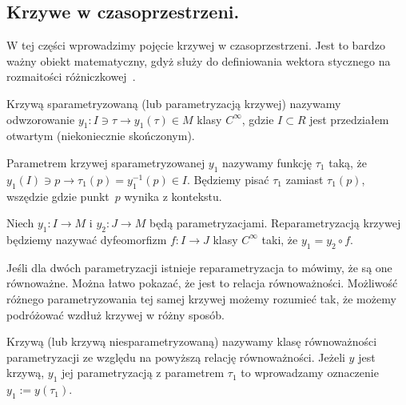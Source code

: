 \subsection{Krzywe w czasoprzestrzeni.}
W tej części wprowadzimy pojęcie krzywej w czasoprzestrzeni. 
Jest to bardzo ważny obiekt matematyczny, gdyż służy do definiowania
wektora stycznego na rozmaitości różniczkowej~\cite{ganca1987}. 
\begin{definition}
Krzywą sparametryzowaną (lub parametryzacją krzywej) nazywamy 
odwzorowanie 
$ y_1 : I \ni \tau \to y_1(\tau) \in M$ klasy $C^\infty$, 
gdzie $I \subset R$ 
jest przedziałem otwartym (niekoniecznie skończonym).
\end{definition}
\begin{definition}
Parametrem krzywej sparametryzowanej $y_1$ 
nazywamy funkcję $\tau_1$ taką, że $ y_1(I) \ni p 
\to \tau_1(p) = y_1^{-1}( p )\in I$. 
Będziemy pisać
$\tau_1$ zamiast $\tau_1(p)$, wszędzie gdzie punkt~$p$ 
wynika z kontekstu.
\end{definition}
\begin{definition}
Niech $y_1: I \to M$ i $y_2:J\to M$ będą parametryzacjami.
Reparametryzacją krzywej będziemy nazywać dyfeomorfizm $f : I \to J$
klasy $C^\infty$
taki, że $y_1 = y_2 \circ f$.
\end{definition}
Jeśli dla dwóch parametryzacji istnieje reparametryzacja to 
mówimy, że są one równoważne. Można łatwo pokazać, że jest to
relacja równoważności. Możliwość różnego parametryzowania tej 
samej krzywej możemy rozumieć tak, że możemy podróżować wzdłuż
krzywej w różny sposób.
\begin{definition}
Krzywą (lub krzywą niesparametryzowaną) nazywamy klasę równoważności
parametryzacji ze względu na powyższą relację równoważności.
Jeżeli $y$ jest krzywą, $y_1$ jej parametryzacją z parametrem $\tau_1$
to wprowadzamy oznaczenie $y_1 := y(\tau_1)$.
\end{definition}
